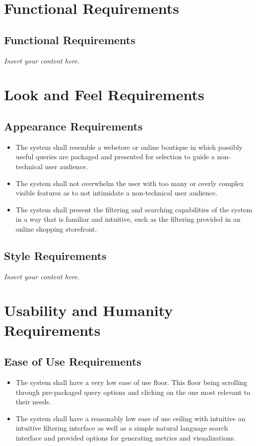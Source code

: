 \documentclass[12pt]{article}
\newcommand{\lips}{\textit{Insert your content here.}}
\begin{document}
\section{Functional Requirements}
\subsection{Functional Requirements}
\lips

\section{Look and Feel Requirements}



\subsection{Appearance Requirements}

\begin{itemize}
    \item The system shall resemble a webstore or online boutique in which possibly useful queries are packaged and presented for selection to guide 
    a non-technical user audience.
    \item The system shall not overwhelm the user with too many or overly complex visible features as to not intimidate a non-technical user audience.
    \item The system shall present the filtering and searching capabilities of the system in a way that is familiar and intuitive, such as the 
    filtering provided in an online shopping storefront.
\end{itemize}

\subsection{Style Requirements}
\lips

\section{Usability and Humanity Requirements}



\subsection{Ease of Use Requirements}

\begin{itemize}
    \item The system shall have a very low ease of use floor. This floor being scrolling through
    pre-packaged query options and clicking on the one most relevant to their needs.
    \item The system shall have a reasonably low ease of use ceiling with intuitive an intuitive filtering interface
    as well as a simple natural language search interface and provided options for generating metrics and visualizations.
\end{itemize}
\end{document}
